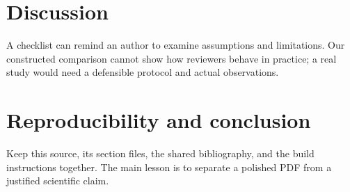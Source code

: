 \section{Discussion}
A checklist can remind an author to examine assumptions and
limitations. Our constructed comparison cannot show how reviewers
behave in practice; a real study would need a defensible protocol
and actual observations.

\section{Reproducibility and conclusion}
Keep this source, its section files, the shared bibliography,
and the build instructions together. The main lesson is to
separate a polished PDF from a justified scientific claim.
